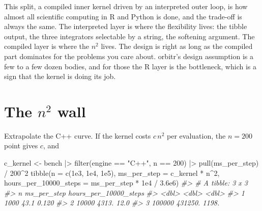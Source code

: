 \documentclass[
  10.5pt,
  letterpaper,
]{scrbook}
\newenvironment{Shaded}{\begin{snugshade}}{\end{snugshade}}
\newcommand{\AttributeTok}[1]{\textcolor[rgb]{0.00,0.00,0.00}{#1}}
\newcommand{\CommentTok}[1]{\textcolor[rgb]{0.00,0.00,0.00}{\textit{#1}}}
\newcommand{\DecValTok}[1]{\textcolor[rgb]{0.00,0.00,0.00}{#1}}
\newcommand{\FloatTok}[1]{\textcolor[rgb]{0.00,0.00,0.00}{#1}}
\newcommand{\FunctionTok}[1]{\textcolor[rgb]{0.00,0.00,0.00}{#1}}
\newcommand{\NormalTok}[1]{\textcolor[rgb]{0.00,0.00,0.00}{#1}}
\newcommand{\OtherTok}[1]{\textcolor[rgb]{0.00,0.00,0.00}{#1}}
\newcommand{\SpecialCharTok}[1]{\textcolor[rgb]{0.00,0.00,0.00}{#1}}
\newcommand{\StringTok}[1]{\textcolor[rgb]{0.00,0.00,0.00}{#1}}
\theoremstyle{definition}
\theoremstyle{plain}
\theoremstyle{remark}
\begin{document}
\begin{tcolorbox}[enhanced jigsaw, arc=.35mm, bottomrule=.15mm, bottomtitle=1mm, breakable, colback=white, colbacktitle=quarto-callout-note-color!10!white, colframe=quarto-callout-note-color-frame, coltitle=black, left=2mm, leftrule=.75mm, opacityback=0, opacitybacktitle=0.6, rightrule=.15mm, title={Where it comes from}, titlerule=0mm, toprule=.15mm, toptitle=1mm]

This split, a compiled inner kernel driven by an interpreted outer loop,
is how almost all scientific computing in R and Python is done, and the
trade-off is always the same. The interpreted layer is where the
flexibility lives: the tibble output, the three integrators selectable
by a string, the softening argument. The compiled layer is where the
\(n^2\) lives. The design is right as long as the compiled part
dominates for the problems you care about. orbitr's design assumption is
a few to a few dozen bodies, and for those the R layer is the
bottleneck, which is a sign that the kernel is doing its job.

\end{tcolorbox}

\section{\texorpdfstring{The \(n^2\)
wall}{The n\^{}2 wall}}\label{the-n2-wall}

Extrapolate the C++ curve. If the kernel costs \(c\,n^2\) per
evaluation, the \(n = 200\) point gives \(c\), and

\begin{Shaded}
\begin{Highlighting}[]
\NormalTok{c\_kernel }\OtherTok{\textless{}{-}}\NormalTok{ bench }\SpecialCharTok{|\textgreater{}} \FunctionTok{filter}\NormalTok{(engine }\SpecialCharTok{==} \StringTok{"C++"}\NormalTok{, n }\SpecialCharTok{==} \DecValTok{200}\NormalTok{) }\SpecialCharTok{|\textgreater{}} \FunctionTok{pull}\NormalTok{(ms\_per\_step) }\SpecialCharTok{/} \DecValTok{200}\SpecialCharTok{\^{}}\DecValTok{2}
\FunctionTok{tibble}\NormalTok{(}\AttributeTok{n =} \FunctionTok{c}\NormalTok{(}\FloatTok{1e3}\NormalTok{, }\FloatTok{1e4}\NormalTok{, }\FloatTok{1e5}\NormalTok{),}
       \AttributeTok{ms\_per\_step =}\NormalTok{ c\_kernel }\SpecialCharTok{*}\NormalTok{ n}\SpecialCharTok{\^{}}\DecValTok{2}\NormalTok{,}
       \AttributeTok{hours\_per\_10000\_steps =}\NormalTok{ ms\_per\_step }\SpecialCharTok{*} \FloatTok{1e4} \SpecialCharTok{/} \FloatTok{3.6e6}\NormalTok{)}
\CommentTok{\#\textgreater{} \# A tibble: 3 x 3}
\CommentTok{\#\textgreater{}        n ms\_per\_step hours\_per\_10000\_steps}
\CommentTok{\#\textgreater{}    \textless{}dbl\textgreater{}       \textless{}dbl\textgreater{}                 \textless{}dbl\textgreater{}}
\CommentTok{\#\textgreater{} 1   1000        43.1                 0.120}
\CommentTok{\#\textgreater{} 2  10000      4313.                 12.0  }
\CommentTok{\#\textgreater{} 3 100000    431250.               1198.}
\end{Highlighting}
\end{Shaded}
\end{document}
